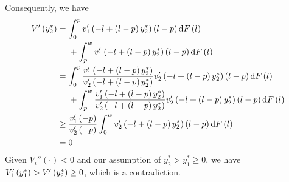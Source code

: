 {\begin{enumerate}
Consequently, we have
\[\begin{aligned}
V_1'\left(y_2^*\right) & = \int_0^p v_1'\left(-l+\left(l-p\right)y_2^*\right)\left(l-p\right)\text dF\left(l\right)\\
& \ \ \ \ +\int_p^w v_1'\left(-l+\left(l-p\right)y_2^*\right)\left(l-p\right)\text dF\left(l\right)\\
& = \int_0^p \frac{v_1'\left(-l+\left(l-p\right)y_2^*\right)}{v_2'\left(-l+\left(l-p\right)y_2^*\right)}v_2'\left(-l+\left(l-p\right)y_2^*\right)\left(l-p\right)\text dF\left(l\right)\\
& \ \ \ \ +\int_p^w \frac{v_1'\left(-l+\left(l-p\right)y_2^*\right)}{v_2'\left(-l+\left(l-p\right)y_2^*\right)}v_2'\left(-l+\left(l-p\right)y_2^*\right)\left(l-p\right)\text dF\left(l\right)\\
& \ge \frac{v_1'\left(-p\right)}{v_2'\left(-p\right)}\int_0^w v_2'\left(-l+\left(l-p\right)y_2^*\right)\left(l-p\right)\text dF\left(l\right)\\
& = 0
\end{aligned}\]
Given $V_i''(\cdot)<0$ and our assumption of $y_2^*>y_1^*\ge 0$, we have
\(V_1'\left(y_1^*\right)> V_1'\left(y_2^*\right)\ge 0\), which is a contradiction.
\end{enumerate}
}

